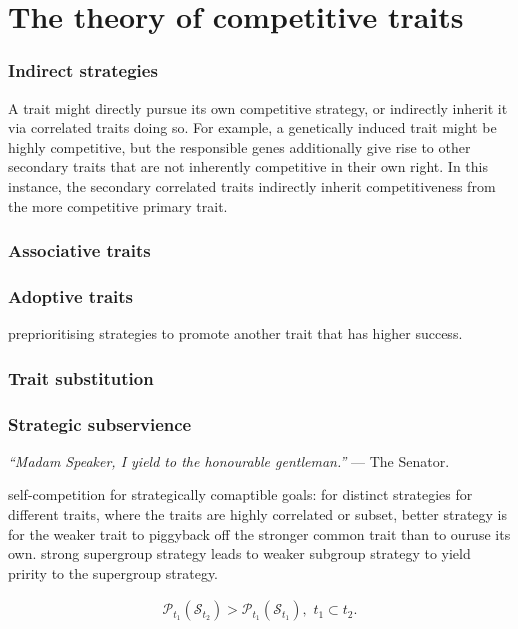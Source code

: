 \documentclass[twocolumn, aps, rmp, amsmath, amssymb, nofootinbib, superscriptaddress, longbibliography, floatfix, table-of-contents, eqsecnum]{revtex4-2}
\newcommand{\famousquote}[2]{{\textit{``#1''} --- #2.}\newline}
\begin{document}
%
%

\part{The theory of competitive traits}

\section{Indirect strategies}

A trait might directly pursue its own competitive strategy, or indirectly inherit it via correlated traits doing so. For example, a genetically induced trait might be highly competitive, but the responsible genes additionally give rise to other secondary traits that are not inherently competitive in their own right. In this instance, the secondary correlated traits indirectly inherit competitiveness from the more competitive primary trait.

\section{Associative traits}

\section{Adoptive traits}

preprioritising strategies to promote another trait that has higher success.

\section{Trait substitution}

\section{Strategic subservience}

\famousquote{Madam Speaker, I yield to the honourable gentleman.}{The Senator}

self-competition for strategically comaptible goals:
for distinct strategies for different traits, where the traits are highly correlated or subset, better strategy is for the weaker trait to piggyback off the stronger common trait than to ouruse its own. strong supergroup strategy leads to weaker subgroup strategy to yield pririty to the supergroup strategy.

\begin{align}
\mathcal{P}_{t_1}(\mathcal{S}_{t_2}) > \mathcal{P}_{t_1}(\mathcal{S}_{t_1}), \,\,t_1\subset t_2.
\end{align}
\end{document}
